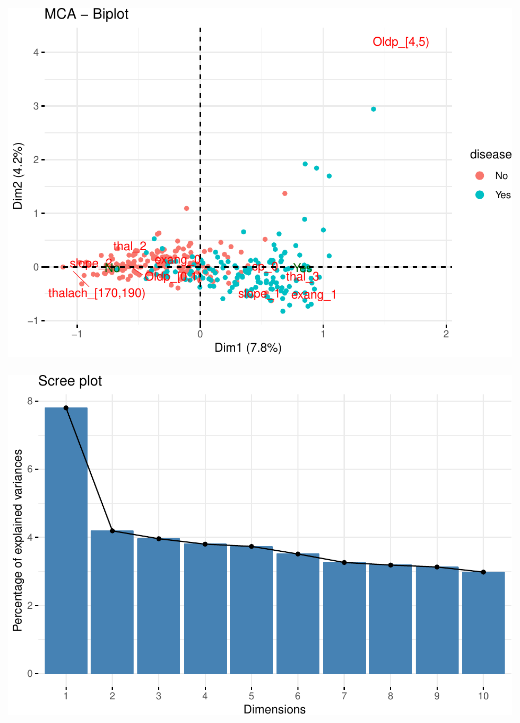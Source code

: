 \documentclass[]{article}
\begin{document}
\includegraphics{project_report_files/figure-latex/unnamed-chunk-22-1.pdf}

\includegraphics{project_report_files/figure-latex/unnamed-chunk-23-1.pdf}
\end{document}
